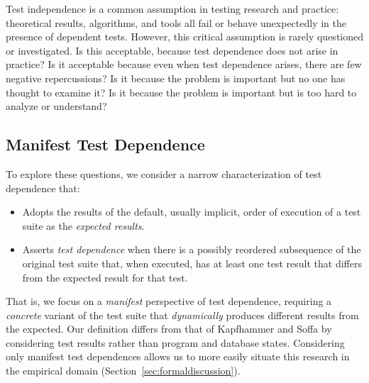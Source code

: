 Test independence is a common assumption in testing research and practice:
theoretical results, algorithms, and tools all fail or behave unexpectedly
in the presence of dependent tests.
However, this critical assumption is rarely questioned or investigated.
Is this acceptable, because test dependence does
not arise in practice?
Is it acceptable because even when test dependence arises, there are few
negative repercussions?
Is it because the problem is important but no one has thought to examine it?
Is it because the problem is important but is too hard to analyze or understand?

\subsection{Manifest Test Dependence}

To explore these questions, we consider a narrow characterization
of test dependence that:
\begin{itemize}
\item Adopts the results of the default, usually implicit,
  order of execution of a test suite as the \emph{expected results}. 
\item Asserts \emph{test dependence} when there is a possibly
  reordered subsequence of the original test suite that, when
  executed, has at least one test result that differs from the
  expected result for that test.  
\end{itemize}
That is, we focus on a \emph{manifest} perspective of test dependence,
requiring a \emph{concrete} variant of the test suite that
\emph{dynamically} produces different results from the expected.  Our
definition differs from that of Kapfhammer and Soffa by considering
test results rather than program and database states.
Considering only manifest test dependences allows
us to more easily situate this research in the empirical domain (Section~\ref{sec:formaldiscussion}).




